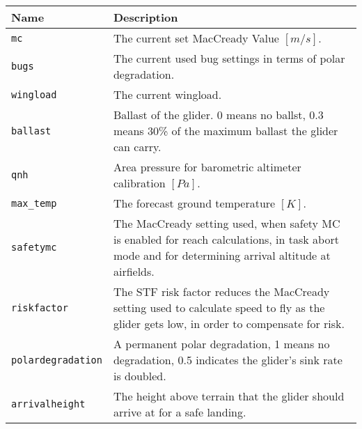 \begin{maxipage}
\begin{tabularx}{1.9\textwidth}{l|X}
Name & Description \\
\hline\hline

\verb|mc| & The current set MacCready Value
$[{m/s}]$.\\

\hline

\verb|bugs| & The current used bug settings in terms of polar degradation.\\

\hline

\verb|wingload| & The current wingload.\\

\hline

\verb|ballast| & Ballast of the glider. 0 means no ballst, 0.3 means 30\% of
the maximum \newline  ballast the glider can carry.\\

\hline

\verb|qnh| & Area pressure for barometric altimeter calibration
$[{Pa}]$.\\

\hline

\verb|max_temp| & The forecast ground temperature
$[{K}]$.\\

\hline

\verb|safetymc| & The MacCready setting used, when safety MC is enabled
for reach \newline calculations, in task abort mode and for determining arrival altitude
at \newline airfields.\\

\hline

\verb|riskfactor| & The STF risk factor reduces the MacCready setting used to
calculate \newline speed to fly as the glider gets low, in order to  compensate for risk.\\

\hline

\verb|polardegradation| & A permanent polar degradation, 1 means no degradation,
0.5 indicates the \newline glider's sink rate is doubled.\\

\hline

\verb|arrivalheight| & The height above terrain that the glider should arrive
at for a safe landing.\\


\end{tabularx}
\end{maxipage}
